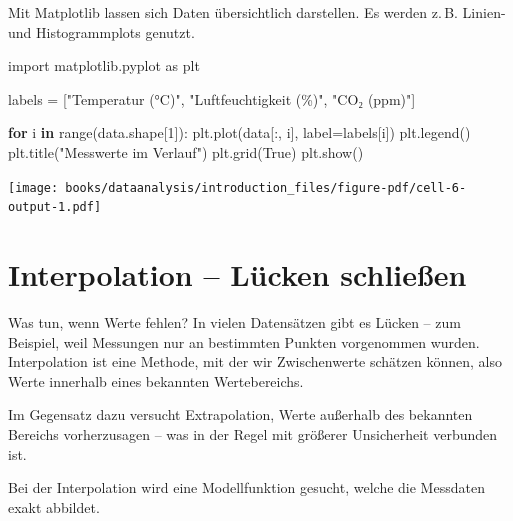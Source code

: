 \documentclass[
  letterpaper,
  DIV=11,
  numbers=noendperiod]{scrreprt}
\newenvironment{Shaded}{\begin{snugshade}}{\end{snugshade}}
\newcommand{\BuiltInTok}[1]{\textcolor[rgb]{0.00,0.23,0.31}{#1}}
\newcommand{\ControlFlowTok}[1]{\textcolor[rgb]{0.00,0.23,0.31}{\textbf{#1}}}
\newcommand{\DecValTok}[1]{\textcolor[rgb]{0.68,0.00,0.00}{#1}}
\newcommand{\ImportTok}[1]{\textcolor[rgb]{0.00,0.46,0.62}{#1}}
\newcommand{\KeywordTok}[1]{\textcolor[rgb]{0.00,0.23,0.31}{\textbf{#1}}}
\newcommand{\NormalTok}[1]{\textcolor[rgb]{0.00,0.23,0.31}{#1}}
\newcommand{\OperatorTok}[1]{\textcolor[rgb]{0.37,0.37,0.37}{#1}}
\newcommand{\StringTok}[1]{\textcolor[rgb]{0.13,0.47,0.30}{#1}}
\newcommand{\VariableTok}[1]{\textcolor[rgb]{0.07,0.07,0.07}{#1}}
\begin{document}
Mit Matplotlib lassen sich Daten übersichtlich darstellen. Es werden
z.\,B. Linien- und Histogrammplots genutzt.

\begin{Shaded}
\begin{Highlighting}[]
\ImportTok{import}\NormalTok{ matplotlib.pyplot }\ImportTok{as}\NormalTok{ plt}

\NormalTok{labels }\OperatorTok{=}\NormalTok{ [}\StringTok{"Temperatur (°C)"}\NormalTok{, }\StringTok{"Luftfeuchtigkeit (\%)"}\NormalTok{, }\StringTok{"CO₂ (ppm)"}\NormalTok{]}

\ControlFlowTok{for}\NormalTok{ i }\KeywordTok{in} \BuiltInTok{range}\NormalTok{(data.shape[}\DecValTok{1}\NormalTok{]):}
\NormalTok{    plt.plot(data[:, i], label}\OperatorTok{=}\NormalTok{labels[i])}
\NormalTok{plt.legend()}
\NormalTok{plt.title(}\StringTok{"Messwerte im Verlauf"}\NormalTok{)}
\NormalTok{plt.grid(}\VariableTok{True}\NormalTok{)}
\NormalTok{plt.show()}
\end{Highlighting}
\end{Shaded}

\texttt{[image: books/dataanalysis/introduction\_files/figure-pdf/cell-6-output-1.pdf]}

\chapter{Interpolation -- Lücken
schließen}\label{interpolation-luxfccken-schlieuxdfen}

Was tun, wenn Werte fehlen? In vielen Datensätzen gibt es Lücken -- zum
Beispiel, weil Messungen nur an bestimmten Punkten vorgenommen wurden.
Interpolation ist eine Methode, mit der wir Zwischenwerte schätzen
können, also Werte innerhalb eines bekannten Wertebereichs.

Im Gegensatz dazu versucht Extrapolation, Werte außerhalb des bekannten
Bereichs vorherzusagen -- was in der Regel mit größerer Unsicherheit
verbunden ist.

Bei der Interpolation wird eine Modellfunktion gesucht, welche die
Messdaten exakt abbildet.
\end{document}
